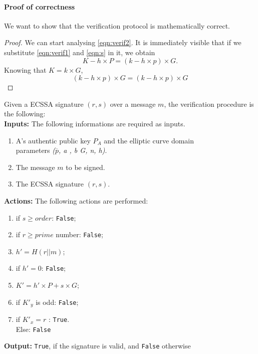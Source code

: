 \paragraph{Proof of correctness}
We want to show that the verification protocol is mathematically correct.
\begin{proof}
	We can start analysing \eqref{eqn:verif2}. It is immediately visible that if we substitute \eqref{eqn:verif1} and \eqref{eqn:s} in it, we obtain
	\begin{equation}
	K - h \times P = (k - h\times p)\times G.
	\end{equation}
	Knowing that $K=k \times G$, 
	\begin{equation}
	(k - h\times p)\times G = (k - h\times p)\times G 
	\end{equation}
	
\end{proof}

Given a ECSSA signature $(r,s)$ over a message $m$, the verification procedure is the following: \\
\textbf{Inputs:} The following informations are required as inputs. 

\hspace{1.1cm}
\begin{minipage}[l]{2\linewidth}
	\begin{enumerate}
		\item A's authentic public key  $P_{A}$ and the elliptic curve domain \\parameters \textit{($\overline{p}$, a , b G, n, h)}.
		\item The message $m$ to be signed.
		\item The ECSSA signature $(r,s)$.\\
	\end{enumerate}
\end{minipage}
\textbf{Actions:} The following actions are performed:

\hspace{1.1cm}
\begin{minipage}[l]{2\linewidth}
	\begin{enumerate}
		\item if $s\geq order$: \texttt{False};
		\item if $r \geq prime$ number: \texttt{False};
		\item $h'= H(r||m)$;
		\item if $h'=0$: \texttt{False};
		\item $K'=h' \times P+s \times G$;
		\item if $K'_{y}$ is odd: \texttt{False};
		\item if $K'_{x} = r$ : \texttt{True}. \\Else: \texttt{False}\\
	\end{enumerate}
\end{minipage}
\textbf{Output:} \texttt{True}, if the signature is valid, and \texttt{False} otherwise





